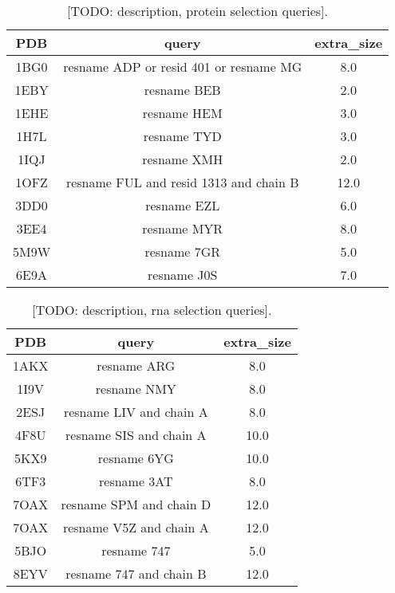 \begin{table}[H]
  \caption{\label{tab:appx1/selection_prot} [TODO: description, protein selection queries].}
  \centering
  \begin{tabular}{ccc}
    \hline
    PDB  & query                                  & extra\_size \\ \hline
    1BG0 & resname ADP or resid 401 or resname MG & 8.0         \\
    1EBY & resname BEB                            & 2.0         \\
    1EHE & resname HEM                            & 3.0         \\
    1H7L & resname TYD                            & 3.0         \\
    1IQJ & resname XMH                            & 2.0         \\
    1OFZ & resname FUL and resid 1313 and chain B & 12.0        \\
    3DD0 & resname EZL                            & 6.0         \\
    3EE4 & resname MYR                            & 8.0         \\
    5M9W & resname 7GR                            & 5.0         \\
    6E9A & resname J0S                            & 7.0         \\ \hline
  \end{tabular}
\end{table}

\begin{table}[H]
  \caption{\label{tab:appx1/selection_rna} [TODO: description, rna selection queries].}
  \centering
  \begin{tabular}{ccc}
    \hline
    PDB  & query                   & extra\_size \\ \hline
    1AKX & resname ARG             & 8.0         \\
    1I9V & resname NMY             & 8.0         \\
    2ESJ & resname LIV and chain A & 8.0         \\
    4F8U & resname SIS and chain A & 10.0        \\
    5KX9 & resname 6YG             & 10.0        \\
    6TF3 & resname 3AT             & 8.0         \\
    7OAX & resname SPM and chain D & 12.0        \\
    7OAX & resname V5Z and chain A & 12.0        \\
    5BJO & resname 747             & 5.0         \\
    8EYV & resname 747 and chain B & 12.0        \\ \hline
  \end{tabular}
\end{table}

